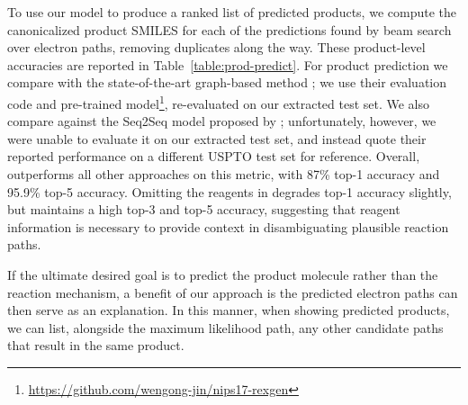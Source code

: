 To use our model to produce a ranked list of predicted products, we compute the canonicalized product SMILES for each of the predictions found by beam search over electron paths, removing duplicates along the way. 
These product-level accuracies are reported in Table~\ref{table:prod-predict}.
For product prediction we compare with the state-of-the-art graph-based method \cite{jin2017predicting};
we use their evaluation code and pre-trained model\footnote{\url{https://github.com/wengong-jin/nips17-rexgen}},
re-evaluated on our extracted test set. 
We also compare against the Seq2Seq model proposed by \citep{schwaller2017found};
unfortunately, however, we were unable to evaluate it on our extracted test set, and instead quote their reported performance on a different USPTO test set for reference.
Overall, \ourModelR outperforms all other approaches on this metric, with 87\% top-1 accuracy and 95.9\% top-5 accuracy.
Omitting the reagents in \ourModelR degrades top-1 accuracy slightly, but maintains a high top-3 and top-5 accuracy,
suggesting that reagent information is necessary to provide context in disambiguating plausible reaction paths.



If the ultimate desired goal is to predict the product molecule rather than the reaction mechanism,
a benefit of our approach is the predicted electron paths can then serve as an explanation. 
In this manner, when showing predicted products, we can list, alongside the maximum likelihood path, any other candidate paths that result in the same product. 




